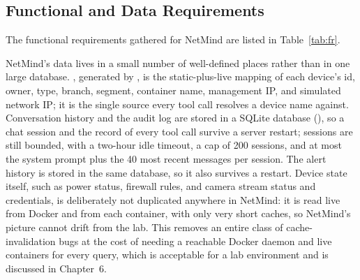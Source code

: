 \subsection{Functional and Data Requirements}

The functional requirements gathered for NetMind are listed in
Table~\ref{tab:fr}.

NetMind's data lives in a small number of well-defined places rather than in
one large database. , generated by
, is the static-plus-live mapping of each device's
id, owner, type, branch, segment, container name, management IP, and
simulated network IP; it is the single source every tool call resolves a
device name against. Conversation history and the audit log are stored in a
SQLite database (), so a chat session and the record of
every tool call survive a server restart; sessions are still bounded, with a
two-hour idle timeout, a cap of 200 sessions, and at most the system prompt
plus the 40 most recent messages per session. The alert history is stored in
the same database, so it also survives a restart. Device state itself, such as power status, firewall
rules, and camera stream status and credentials, is deliberately not
duplicated anywhere in NetMind: it is read live from Docker and from each
container, with only very short caches, so NetMind's picture cannot drift
from the lab. This removes an entire class of cache-invalidation bugs at the
cost of needing a reachable Docker daemon and live containers for every
query, which is acceptable for a lab environment and is discussed in
Chapter~6.

